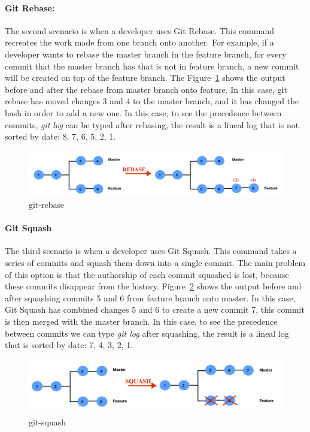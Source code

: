 \documentclass[a4paper, 12pt]{book}
\begin{document}
\paragraph{Git Rebase:} The second scenario is when a developer uses Git Rebase. This command recreates the work made from one branch onto another. For example, if a developer wants to rebase the master branch in the feature branch, for every commit that the master branch has that is not in feature branch, a new commit will be created on top of the feature branch. The Figure~\ref{fig:gitrebase} shows the output before and after the rebase from master branch onto feature. In this case, git rebase has moved changes 3 and 4 to the master branch, and it has changed the hash in order to add a new one. In this case, to see the precedence between commits, \emph{git log} can be typed after rebasing, the result is a lineal log that is not sorted by date: 8, 7, 6, 5, 2, 1.
\begin{figure}[ht]
\centering
\includegraphics[width=\columnwidth]{img/gitrebase.png}
\caption{git-rebase}
\label{fig:gitrebase}       %
\end{figure}

\paragraph{Git Squash}  The third scenario is when a developer uses Git Squash. This command takes a series of commits and squash them down into a single commit. The main problem of this option is that the authorship of each commit squashed is lost, because these commits disappear from the history. Figure~\ref{fig:gitsquash} shows the output before and after squashing commits 5 and 6 from feature branch onto master. In this case, Git Squash has combined changes 5 and 6 to create a new commit 7,  this commit is then merged with the master branch. In this case, to see the precedence between commits we can type \emph{git log} after squashing, the result is a lineal log  that is sorted by date:  7, 4, 3, 2, 1.
\begin{figure}[ht]
\centering
\includegraphics[width=\columnwidth]{img/gitsquash.png}
\caption{git-squash}
\label{fig:gitsquash}       %
\end{figure}
\end{document}

